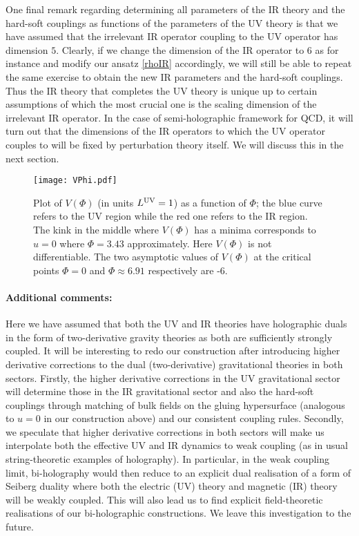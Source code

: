 \documentclass[prd,reprint,a4paper,showpacs,superscriptaddress,11pt,onecolumn,nofootinbib]{revtex4-1}
\renewcommand{\(}{\left(}
\renewcommand{\)}{\right)}
\newcommand{\6}{\partial}
\begin{document}
One final remark regarding determining all parameters of the IR theory and the hard-soft couplings as functions of the parameters of the UV theory is that we have assumed that the  irrelevant IR operator coupling to the UV operator has dimension $5$. Clearly, if we change the dimension of the IR operator to $6$ as for instance and modify our ansatz \eqref{rhoIR} accordingly, we will still be able to repeat the same exercise to obtain the new IR parameters and the hard-soft couplings. Thus the IR theory that completes the UV theory is unique up to certain assumptions of which the most crucial one is the scaling dimension of the irrelevant IR operator. In the case of semi-holographic framework for QCD, it will turn out that the dimensions of the IR operators to which the UV operator couples to will be fixed by perturbation theory itself. We will discuss this in the next section.
\begin{figure}[ht]
\centering
\texttt{[image: VPhi.pdf]}
\caption{\label{VPhi}Plot of $V(\Phi)$ (in units $L^{\rm UV} = 1$) as a function of $\Phi$; the blue curve refers to the UV region while the red one refers to the IR region. The kink in the middle where $V(\Phi)$ has a minima corresponds to $u=0$ where $\Phi = 3.43$ approximately. Here $V(\Phi)$ is not differentiable. The two asymptotic values of $V(\Phi)$ at the critical points $\Phi = 0$ and $\Phi \approx 6.91$ respectively are -6.}
\end{figure}
\paragraph{Additional comments:} Here we have assumed that both the UV and IR theories have holographic duals in the form of two-derivative gravity theories as both are sufficiently strongly coupled. It will be interesting to redo our construction after introducing higher derivative corrections to the dual (two-derivative) gravitational theories in both sectors. Firstly, the higher derivative corrections in the UV gravitational sector will determine those in the IR gravitational sector and also the hard-soft couplings through matching of bulk fields on the gluing hypersurface (analogous to $u= 0$ in our construction above) and our consistent coupling rules. Secondly, we speculate that higher derivative corrections in both sectors will make us interpolate both the effective UV and IR dynamics to weak coupling (as in usual string-theoretic examples of holography). In particular, in the weak coupling limit, bi-holography would then reduce to an explicit dual realisation of a form of Seiberg duality \cite{Intriligator:1995au} where both the electric (UV) theory and magnetic (IR) theory will be weakly coupled. This will also lead us to find explicit field-theoretic realisations of our bi-holographic constructions. We leave this investigation to the future.
\end{document}
